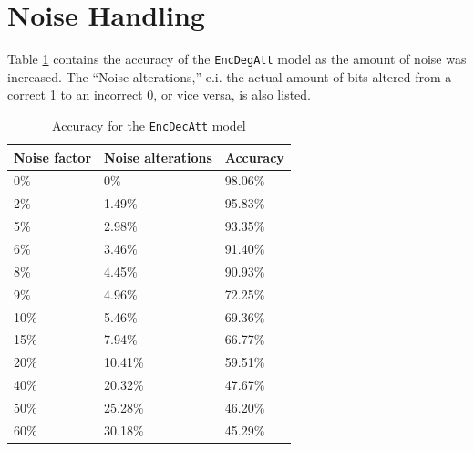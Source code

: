 
\newpage
\section{Noise Handling}
\label{sec:noise_handling}
Table \ref{table:noise_accuracy} contains the accuracy of the {\tt EncDegAtt} model as the amount of noise was increased. The ``Noise alterations,'' e.i. the actual amount of bits altered from a correct 1 to an incorrect 0, or vice versa, is also listed. 

\begin{table}[ht]
    \centering
    \begin{tabular}{|l|l|l|}
        \hline 
        \textbf{Noise factor}          & \textbf{Noise alterations}       & \textbf{Accuracy}         \\ \hline
        0\%                            & 0\%                              & 98.06\%                   \\ \hline
        2\%                            & 1.49\%                           & 95.83\%                   \\ \hline
        5\%                            & 2.98\%                           & 93.35\%                   \\ \hline
        6\%                            & 3.46\%                           & 91.40\%                   \\ \hline
        8\%                            & 4.45\%                           & 90.93\%                   \\ \hline
        9\%                            & 4.96\%                           & 72.25\%                   \\ \hline
        10\%                           & 5.46\%                           & 69.36\%                   \\ \hline
        15\%                           & 7.94\%                           & 66.77\%                   \\ \hline
        20\%                           & 10.41\%                          & 59.51\%                   \\ \hline
        40\%                           & 20.32\%                          & 47.67\%                   \\ \hline
        50\%                           & 25.28\%                          & 46.20\%                   \\ \hline
        60\%                           & 30.18\%                          & 45.29\%                   \\ \hline
    \end{tabular}
    \caption{Accuracy for the {\tt EncDecAtt} model}
    \label{table:noise_accuracy}
\end{table}

